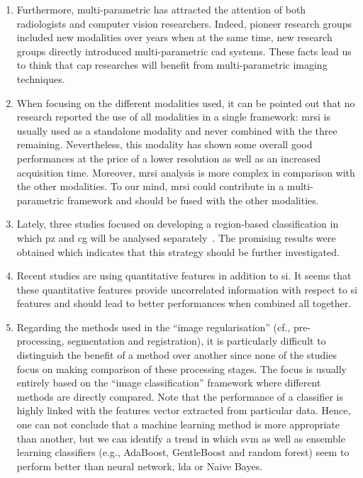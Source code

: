 \begin{enumerate}
\item Furthermore, multi-parametric has attracted the attention of both radiologists and computer vision researchers. Indeed, pioneer research groups included new modalities over years when at the same time, new research groups directly introduced multi-parametric \ac{cad} systems. These facts lead us to think that \ac{cap} researches will benefit from multi-parametric imaging techniques.

\item When focusing on the different modalities used, it can be pointed out that no research reported the use of all modalities in a single framework: \ac{mrsi} is usually used as a standalone modality and never combined with the three remaining. Nevertheless, this modality has shown some overall good performances at the price of a lower resolution as well as an increased acquisition time. Moreover, \ac{mrsi} analysis is more complex in comparison with the other modalities. To our mind, \ac{mrsi} could contribute in a multi-parametric framework and should be fused with the other modalities.

\item Lately, three studies focused on developing a region-based classification in which \ac{pz} and \ac{cg} will be analysed separately~\cite{Viswanath2012,Litjens2012,Litjens2014}. The promising results were obtained which indicates that this strategy should be further investigated.

\item Recent studies are using quantitative features in addition to \ac{si}. It seems that these quantitative features provide uncorrelated information with respect to \ac{si} features and should lead to better performances when combined all together. 

\item Regarding the methods used in the ``image regularisation'' (cf., pre-processing, segmentation and registration), it is particularly difficult to distinguish the benefit of a method over another since none of the studies focus on making comparison of these processing stages. The focus is usually entirely based on the ``image classification'' framework where different methods are directly compared. Note that the performance of a classifier is highly linked with the features vector extracted from particular data. Hence, one can not conclude that a machine learning method is more appropriate than another, but we can identify a trend in which \ac{svm} as well as ensemble learning classifiers (e.g., AdaBoost, GentleBoost and random forest) seem to perform better than neural network, \ac{lda} or Naive Bayes.


\end{enumerate}
